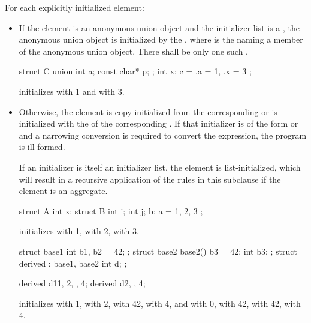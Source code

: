 \pnum
For each explicitly initialized element:
\begin{itemize}
\item
If the element is an anonymous union object and
the initializer list is a ,
the anonymous union object is initialized by the
 \tcode{\{ }\tcode{ \}},
where  is the 
naming a member of the anonymous union object.
There shall be only one such .
\begin{example}
\begin{codeblock}
struct C {
  union {
    int a;
    const char* p;
  };
  int x;
} c = { .a = 1, .x = 3 };
\end{codeblock}
initializes  with 1 and  with 3.
\end{example}
\item
Otherwise, the element is copy-initialized
from the corresponding 
or is initialized with the 
of the corresponding .
If that initializer is of the form
 or
\tcode{= }
and
a narrowing conversion is required
to convert the expression, the program is ill-formed.
\begin{note} If an initializer is itself an initializer list,
the element is list-initialized, which will result in a recursive application
of the rules in this subclause if the element is an aggregate. \end{note}
\begin{example}
\begin{codeblock}
struct A {
  int x;
  struct B {
    int i;
    int j;
  } b;
} a = { 1, { 2, 3 } };
\end{codeblock}
initializes
with 1,
with 2,
with 3.

\begin{codeblock}
struct base1 { int b1, b2 = 42; };
struct base2 {
  base2() {
    b3 = 42;
  }
  int b3;
};
struct derived : base1, base2 {
  int d;
};

derived d1{{1, 2}, {}, 4};
derived d2{{}, {}, 4};
\end{codeblock}
initializes
 with 1,
 with 2,
 with 42,
 with 4, and
 with 0,
 with 42,
 with 42,
 with 4.
\end{example}
\end{itemize}

